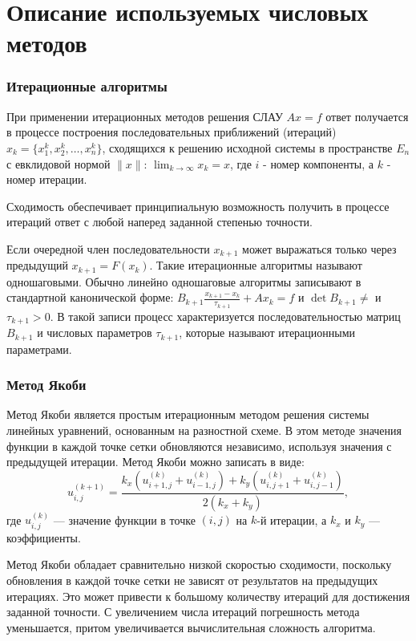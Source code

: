 \documentclass[a4paper, fleqn]{report}
\begin{document}
\chapter{Описание используемых числовых методов}

\subsection*{Итерационные алгоритмы}

При применении итерационных методов решения СЛАУ $Ax = f$ ответ получается в процессе построения последовательных приближений (итераций) $x_k = \{x_1^k, x_2^k, \dots, x_n^k\}$, сходящихся к решению исходной системы в пространстве $E_n$ с евклидовой нормой $\|x\|$: $\lim_{k \to \infty} x_k = x$, где $i$ - номер компоненты, а $k$ - номер итерации.

Сходимость обеспечивает принципиальную возможность получить в процессе итераций ответ с любой наперед заданной степенью точности. 

Если очередной член последовательности $x_{k+1}$ может выражаться только через предыдущий $x_{k+1} = F(x_k) $. Такие итерационные алгоритмы называют одношаговыми. Обычно линейно одношаговые алгоритмы записывают в стандартной канонической форме:
$B_{k+1} \frac{x_{k+1} - x_k}{\tau_{k+1}} + Ax_k = f$ и $\det B_{k+1} \neq$ и $\tau_{k+1} > 0$. В такой записи процесс характеризуется последовательностью матриц $B_{k+1}$ и числовых параметров $\tau_{k+1}$, которые называют итерационными параметрами.

\subsection*{Метод Якоби}
Метод Якоби является простым итерационным методом решения системы линейных уравнений, основанным на разностной схеме. В этом методе значения функции в каждой точке сетки обновляются независимо, используя значения с предыдущей итерации. Метод Якоби можно записать в виде:
\[
u_{i,j}^{(k+1)} = \frac{k_x (u_{i+1,j}^{(k)} + u_{i-1,j}^{(k)}) + k_y (u_{i,j+1}^{(k)} + u_{i,j-1}^{(k)})}{2(k_x + k_y)},
\]
где \( u_{i,j}^{(k)} \) — значение функции в точке \((i, j)\) на \( k \)-й итерации, а \( k_x \) и \( k_y \) — коэффициенты.

Метод Якоби обладает сравнительно низкой скоростью сходимости, поскольку обновления в каждой точке сетки не зависят от результатов на предыдущих итерациях. Это может привести к большому количеству итераций для достижения заданной точности. С увеличением числа итераций погрешность метода уменьшается, притом увеличивается вычислительная сложность алгоритма.
\end{document}
